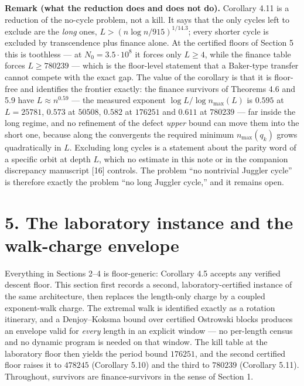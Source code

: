 \documentclass[12pt]{article}
\begin{document}
\textbf{Remark (what the reduction does and does not do).} Corollary
4.11 is a reduction of the no-cycle problem, not a kill. It says that
the only cycles left to exclude are the \emph{long} ones,
\(L>(n\log n/915)^{1/14.3}\); every shorter cycle is excluded by
transcendence plus finance alone. At the certified floors of Section 5
this is toothless --- at \(N_0=3.5\cdot 10^8\) it forces only
\(L\ge 4\), while the finance table forces \(L\ge 780239\) --- which is
the floor-level statement that a Baker-type transfer cannot compete with
the exact gap. The value of the corollary is that it is floor-free and
identifies the frontier exactly: the finance survivors of Theorems 4.6
and 5.9 have \(L\approx n^{0.59}\) --- the measured exponent
\(\log L/\log n_{\max}(L)\) is \(0.595\) at \(L=25781\), \(0.573\) at
\(50508\), \(0.582\) at \(176251\) and \(0.611\) at \(780239\) --- far
inside the long regime, and no refinement of the defect \emph{upper}
bound can move them into the short one, because along the convergents
the required minimum \(n_{\max}(q_k)\) grows quadratically in \(L\).
Excluding long cycles is a statement about the parity word of a specific
orbit at depth \(L\), which no estimate in this note or in the companion
discrepancy manuscript {[}16{]} controls. The problem ``no nontrivial
Juggler cycle'' is therefore exactly the problem ``no long Juggler
cycle,'' and it remains open.

\section{5. The laboratory instance and the walk-charge
envelope}\label{the-laboratory-instance-and-the-walk-charge-envelope}

Everything in Sections 2--4 is floor-generic: Corollary 4.5 accepts any
verified descent floor. This section first records a second,
laboratory-certified instance of the same architecture, then replaces
the length-only charge by a coupled exponent-walk charge. The extremal
walk is identified exactly as a rotation itinerary, and a Denjoy--Koksma
bound over certified Ostrowski blocks produces an envelope valid for
\emph{every} length in an explicit window --- no per-length census and
no dynamic program is needed on that window. The kill table at the
laboratory floor then yields the period bound \(176251\), and the second
certified floor raises it to \(478245\) (Corollary 5.10) and the third
to \(780239\) (Corollary 5.11). Throughout, survivors are
finance-survivors in the sense of Section 1.
\end{document}
